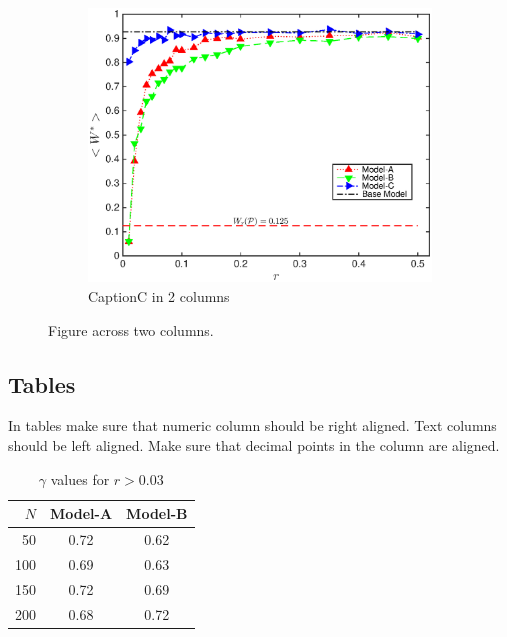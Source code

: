 \documentclass[10pt,journal,compsoc]{IEEEtran}
\theoremstyle{plain}
\theoremstyle{definition}
\theoremstyle{remark}
\begin{document}
\begin{figure}[!tbp]
	\begin{subfigure}{\columnwidth}%
		\includegraphics[width=\columnwidth]
			{Fig-FigureC}
		\caption{CaptionC in 2 columns} 
		\label{fig:figureCin2}
	\end{subfigure}
	\caption{
		Figure across two columns.
	} 
	\label{fig:twoColumn}
\end{figure}



\subsection{Tables}

In tables make sure that numeric column should be right aligned.
Text columns should be left aligned.
Make sure that decimal points in the column are aligned.

\begin{table}[th]
	\caption{$\gamma$ values for $r > 0.03$}
	\begin{center}
	\begin{tabular}{|r|cc|}
		\hline
		$N$
		&Model-A %
		&Model-B\\
		\hline
		50
		&0.72
		&0.62\\
		100
		&0.69
		&0.63\\
		150
		&0.72
		&0.69\\
		200
		&0.68
		&0.72\\
		\hline
	\end{tabular}
	\end{center}
	\label{tbl:tableA}
\end{table}%
\end{document}
